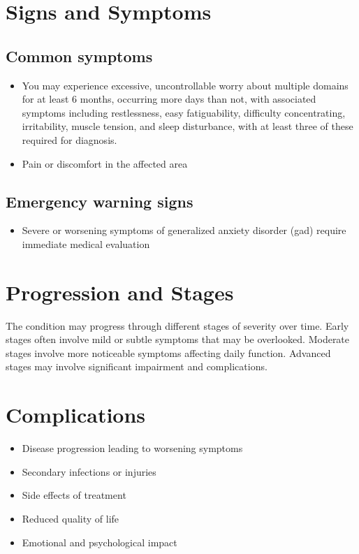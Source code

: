 \section{Signs and Symptoms}
\subsection{Common symptoms}
\begin{itemize}[noitemsep]
  \item You may experience excessive, uncontrollable worry about multiple domains for at least 6 months, occurring more days than not, with associated symptoms including restlessness, easy fatiguability, difficulty concentrating, irritability, muscle tension, and sleep disturbance, with at least three of these required for diagnosis.
  \item Pain or discomfort in the affected area
  \end{itemize}
\subsection{Emergency warning signs}
\begin{itemize}[noitemsep]
  \item Severe or worsening symptoms of generalized anxiety disorder (gad) require immediate medical evaluation
\end{itemize}
\section{Progression and Stages}
The condition may progress through different stages of severity over time. Early stages often involve mild or subtle symptoms that may be overlooked. Moderate stages involve more noticeable symptoms affecting daily function. Advanced stages may involve significant impairment and complications.
\section{Complications}
\begin{itemize}[noitemsep]
  \item Disease progression leading to worsening symptoms
  \item Secondary infections or injuries
  \item Side effects of treatment
  \item Reduced quality of life
  \item Emotional and psychological impact
\end{itemize}

